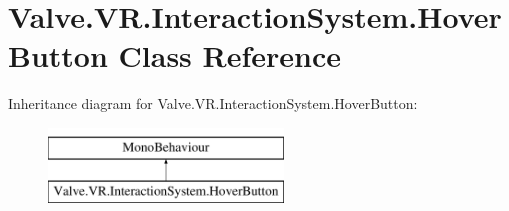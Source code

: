 \hypertarget{class_valve_1_1_v_r_1_1_interaction_system_1_1_hover_button}{}\section{Valve.\+V\+R.\+Interaction\+System.\+Hover\+Button Class Reference}
\label{class_valve_1_1_v_r_1_1_interaction_system_1_1_hover_button}
Inheritance diagram for Valve.\+V\+R.\+Interaction\+System.\+Hover\+Button\+:\begin{figure}[H]
\begin{center}
\leavevmode
\includegraphics[height=2.000000cm]{class_valve_1_1_v_r_1_1_interaction_system_1_1_hover_button}
\end{center}
\end{figure}
